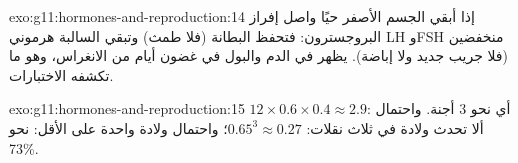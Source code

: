 \begin{solution}{exo:g11:hormones-and-reproduction:14}
إذا أبقي الجسم الأصفر حيًا واصل إفراز البروجسترون: فتحفظ البطانة (فلا
طمث) وتبقي  السالبة هرموني LH وFSH
منخفضين (فلا جريب جديد ولا إباضة).  يظهر في الدم والبول في غضون أيام من الانغراس، وهو ما
تكشفه الاختبارات.
\end{solution}

\begin{solution}{exo:g11:hormones-and-reproduction:15}
$12 \times 0.6 \times 0.4 \approx 2.9$: أي نحو 3 أجنة. واحتمال ألا
تحدث ولادة في ثلاث نقلات: $0.65^3 \approx 0.27$؛ واحتمال ولادة واحدة
على الأقل: نحو 73\%.
\end{solution}

